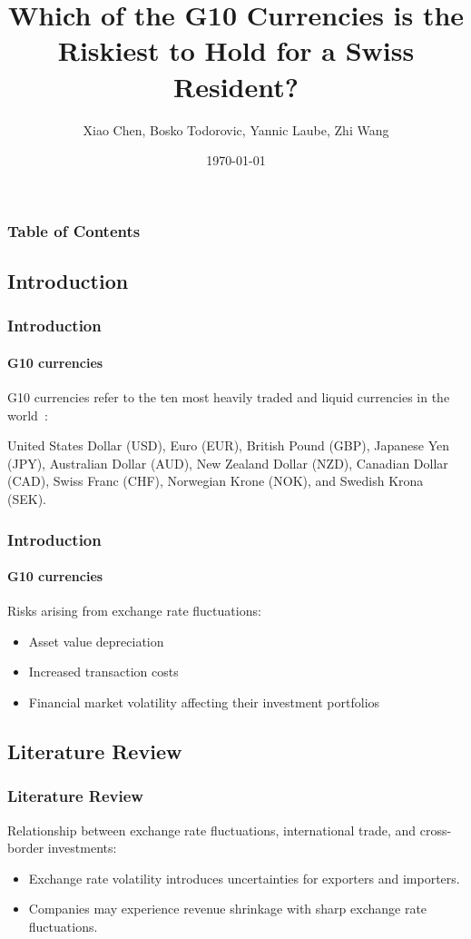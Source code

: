 \documentclass[10pt]{beamer}
\author{Xiao Chen, Bosko Todorovic, Yannic Laube, Zhi Wang}
\title{Which of the G10 Currencies is the Riskiest to Hold for a Swiss Resident?}
\institute{University of Zurich}
\date{\today}
\begin{document}
\begin{frame}
\titlepage
\end{frame}
\begin{frame}
\frametitle{Table of Contents}
\tableofcontents
\end{frame}
\begin{frame}
\section{Introduction}
\frametitle{Introduction}
\framesubtitle{G10 currencies}
G10 currencies refer to the ten most heavily traded and liquid currencies in the world~\cite{bis2022report}: 

United States Dollar (USD), Euro (EUR), British Pound (GBP), Japanese Yen (JPY), Australian Dollar (AUD), New Zealand Dollar (NZD), Canadian Dollar (CAD), Swiss Franc (CHF), Norwegian Krone (NOK), and Swedish Krona (SEK).

\end{frame}
\begin{frame}
\frametitle{Introduction}
\framesubtitle{G10 currencies}
Risks arising from exchange rate fluctuations:
\begin{itemize}
    \item Asset value depreciation
    \item Increased transaction costs
    \item Financial market volatility affecting their investment portfolios
\end{itemize}
\end{frame}
\begin{frame}
\section{Literature Review}
\frametitle{Literature Review}
Relationship between exchange rate fluctuations, international trade, and cross-border investments:~\cite{AUBOIN_RUTA_2013}
\begin{itemize}
    \item Exchange rate volatility introduces uncertainties for exporters and importers.
    \item Companies may experience revenue shrinkage with sharp exchange rate fluctuations.
\end{itemize}
\end{frame}
\end{document}
